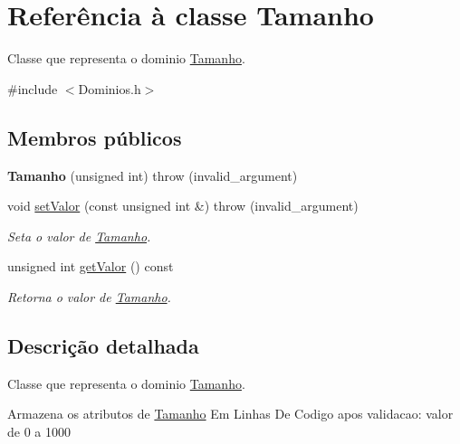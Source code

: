 \hypertarget{class_tamanho}{
\section{\-Referência à classe \-Tamanho}
\label{class_tamanho}
}


\-Classe que representa o dominio \hyperlink{class_tamanho}{\-Tamanho}.  




{\ttfamily \#include $<$\-Dominios.\-h$>$}

\subsection*{\-Membros públicos}
\begin{DoxyCompactItemize}
\item 
\hypertarget{class_tamanho_a63541f3ebe1209729030e17b6a21236c}{
{\bfseries \-Tamanho} (unsigned int)  throw (invalid\-\_\-argument)}
\label{class_tamanho_a63541f3ebe1209729030e17b6a21236c}

\item 
void \hyperlink{class_tamanho_afb80c548279d5baa4f0ef163f7f564d0}{set\-Valor} (const unsigned int \&)  throw (invalid\-\_\-argument)
\begin{DoxyCompactList}\small\item\em \-Seta o valor de \hyperlink{class_tamanho}{\-Tamanho}. \end{DoxyCompactList}\item 
unsigned int \hyperlink{class_tamanho_a0150e086c4b3d37b9d98e34c34532a10}{get\-Valor} () const 
\begin{DoxyCompactList}\small\item\em \-Retorna o valor de \hyperlink{class_tamanho}{\-Tamanho}. \end{DoxyCompactList}\end{DoxyCompactItemize}


\subsection{\-Descrição detalhada}
\-Classe que representa o dominio \hyperlink{class_tamanho}{\-Tamanho}. 

\-Armazena os atributos de \hyperlink{class_tamanho}{\-Tamanho} \-Em \-Linhas \-De \-Codigo apos validacao\-: valor de 0 a 1000 

